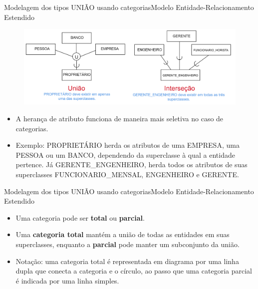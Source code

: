 \documentclass[t]{beamer}
\begin{document}
\begin{ftst}{Modelagem dos tipos UNIÃO usando categorias}{Modelo Entidade-Relacionamento Estendido}
\begin{figure}
    \centering
    \includegraphics[scale=0.12]{Figuras/02_05.png}
\end{figure}
\footnotesize
\begin{itemize}
    \item A herança de atributo funciona de maneira mais seletiva no caso de categorias. 
    \item Exemplo: PROPRIETÁRIO herda os atributos de uma EMPRESA, uma PESSOA ou um BANCO, dependendo da superclasse à qual a entidade pertence. Já GERENTE\_ENGENHEIRO, herda todos os atributos de suas superclasses FUNCIONARIO\_MENSAL, ENGENHEIRO e GERENTE.
\end{itemize}
\end{ftst}


\begin{ftst}{Modelagem dos tipos UNIÃO usando categorias}{Modelo Entidade-Relacionamento Estendido}
\begin{itemize}
    \item Uma categoria pode ser \textbf{total} ou \textbf{parcial}. 
    \item Uma \textbf{categoria total} mantém a união de todas as entidades em suas superclasses, enquanto a \textbf{parcial} pode manter um subconjunto da união. 
    \item Notação: uma categoria total é representada em diagrama por uma linha dupla que conecta a categoria e o círculo, ao passo que uma categoria parcial é indicada por uma linha simples.
\end{itemize}
\end{ftst}
\end{document}

